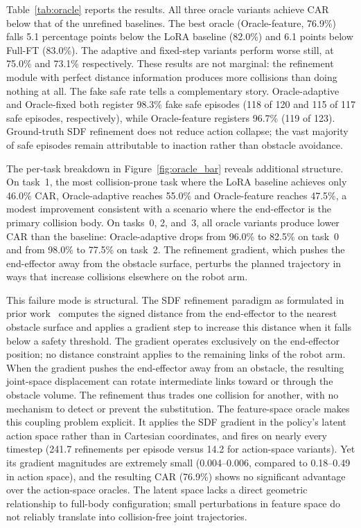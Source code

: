 Table~\ref{tab:oracle} reports the results. All three oracle variants achieve CAR below that of the unrefined baselines. The best oracle (Oracle-feature, 76.9\%) falls 5.1 percentage points below the LoRA baseline (82.0\%) and 6.1 points below Full-FT (83.0\%). The adaptive and fixed-step variants perform worse still, at 75.0\% and 73.1\% respectively. These results are not marginal: the refinement module with perfect distance information produces more collisions than doing nothing at all. The fake safe rate tells a complementary story. Oracle-adaptive and Oracle-fixed both register 98.3\% fake safe episodes (118 of 120 and 115 of 117 safe episodes, respectively), while Oracle-feature registers 96.7\% (119 of 123). Ground-truth SDF refinement does not reduce action collapse; the vast majority of safe episodes remain attributable to inaction rather than obstacle avoidance.

The per-task breakdown in Figure~\ref{fig:oracle_bar} reveals additional structure. On task~1, the most collision-prone task where the LoRA baseline achieves only 46.0\% CAR, Oracle-adaptive reaches 55.0\% and Oracle-feature reaches 47.5\%, a modest improvement consistent with a scenario where the end-effector is the primary collision body. On tasks~0, 2, and~3, all oracle variants produce lower CAR than the baseline: Oracle-adaptive drops from 96.0\% to 82.5\% on task~0 and from 98.0\% to 77.5\% on task~2. The refinement gradient, which pushes the end-effector away from the obstacle surface, perturbs the planned trajectory in ways that increase collisions elsewhere on the robot arm.

This failure mode is structural. The SDF refinement paradigm as formulated in prior work~\cite{hu2025vlsa} computes the signed distance from the end-effector to the nearest obstacle surface and applies a gradient step to increase this distance when it falls below a safety threshold. The gradient operates exclusively on the end-effector position; no distance constraint applies to the remaining links of the robot arm. When the gradient pushes the end-effector away from an obstacle, the resulting joint-space displacement can rotate intermediate links toward or through the obstacle volume. The refinement thus trades one collision for another, with no mechanism to detect or prevent the substitution. The feature-space oracle makes this coupling problem explicit. It applies the SDF gradient in the policy's latent action space rather than in Cartesian coordinates, and fires on nearly every timestep (241.7 refinements per episode versus 14.2 for action-space variants). Yet its gradient magnitudes are extremely small (0.004--0.006, compared to 0.18--0.49 in action space), and the resulting CAR (76.9\%) shows no significant advantage over the action-space oracles. The latent space lacks a direct geometric relationship to full-body configuration; small perturbations in feature space do not reliably translate into collision-free joint trajectories.

